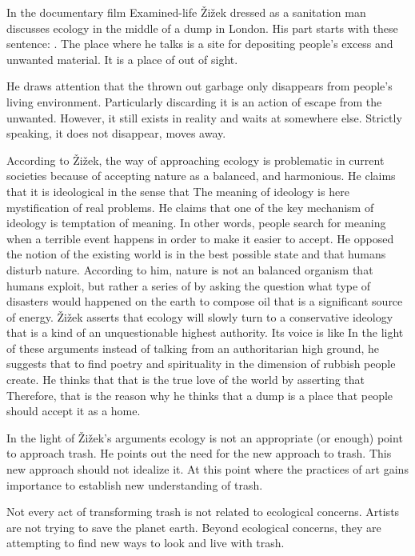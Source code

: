 In the documentary film Examined-life Žižek dressed as a sanitation man discusses ecology in the middle of a dump in London. His part starts with these sentence: . The place where he talks is a site for depositing people’s excess and unwanted material. It is a place of out of sight.

He draws attention that the thrown out garbage only disappears from people’s living environment. Particularly discarding it is an action of escape from the unwanted. However, it still exists in reality and waits at somewhere else. Strictly speaking, it does not disappear, moves away.

According to Žižek, the way of approaching ecology is problematic in current societies because of accepting nature as a balanced, and harmonious. He claims that it is ideological in the sense that  The meaning of ideology is here mystification of real problems. He claims that one of the key mechanism of ideology is temptation of meaning. In other words, people search for meaning when a terrible event happens in order to make it easier to accept. He opposed the notion of the existing world is in the best possible state and that humans disturb nature. According to him, nature is not an balanced organism that humans exploit, but rather a series of  by asking the question what type of disasters would happened on the earth to compose oil that is a significant source of energy. Žižek asserts that ecology will slowly turn to a conservative ideology that is a kind of an unquestionable highest authority. Its voice is like  In the light of these arguments instead of talking from an authoritarian high ground, he suggests that to find poetry and spirituality in the dimension of rubbish people create. He thinks that that is the true love of the world by asserting that  Therefore, that is the reason why he thinks that a dump is a place that people should accept it as a home. 

In the light of Žižek’s arguments ecology is not an appropriate (or enough) point to approach trash. He points out the need for the new approach to trash. This new approach should not idealize it. At this point where the practices of art gains importance to establish new understanding of trash.

Not every act of transforming trash is not related to ecological concerns. Artists are not trying to save the planet earth. Beyond ecological concerns, they are attempting to find new ways to look and live with trash. 

